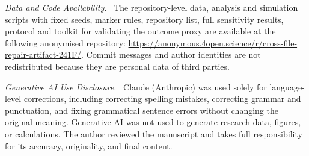 \documentclass[runningheads]{llncs}
\newcommand{\runin}[1]{\par\textit{#1}\ }
\begin{document}
\runin{Data and Code Availability.} The repository-level data, analysis and simulation scripts with fixed seeds, marker rules, repository list, full sensitivity results, protocol and toolkit for validating the outcome proxy are available at the following anonymised repository: \url{https://anonymous.4open.science/r/cross-file-repair-artifact-241F/}. Commit messages and author identities are not redistributed because they are personal data of third parties.

\runin{Generative AI Use Disclosure.} Claude (Anthropic) was used solely for language-level corrections, including correcting spelling mistakes, correcting grammar and punctuation, and fixing grammatical sentence errors without changing the original meaning. Generative AI was not used to generate research data, figures, or calculations. The author reviewed the manuscript and takes full responsibility for its accuracy, originality, and final content.
\end{document}
